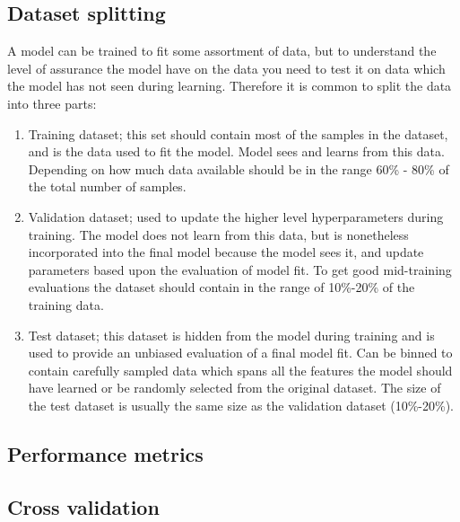 \documentclass[thesis.tex]{subfiles}
\begin{document}
\subsection{Dataset splitting}
A model can be trained to fit some assortment of data, but to understand the level of assurance the model have on the data you need to test it on data which the model has not seen during learning. Therefore it is common to split the data into three parts:
\begin{enumerate}
\item Training dataset; this set should contain most of the samples in the dataset, and is the data used to fit the model. Model sees and learns from this data. Depending on how much data available should be in the range 60\% - 80\% of the total number of samples.

\item Validation dataset; used to update the higher level hyperparameters during training. The model does not learn from this data, but is nonetheless incorporated into the final model because the model sees it, and update parameters based upon the evaluation of model fit. To get good mid-training evaluations the dataset should contain in the range of 10\%-20\% of the training data.

\item Test dataset; this dataset is hidden from the model during training and is used to provide an unbiased evaluation of a final model fit. Can be binned to contain carefully sampled data which spans all the features the model should have learned or be randomly selected from the original dataset. The size of the test dataset is usually the same size as the validation dataset (10\%-20\%).
\end{enumerate}



\subsection{Performance metrics}



\subsection{Cross validation}
\end{document}
